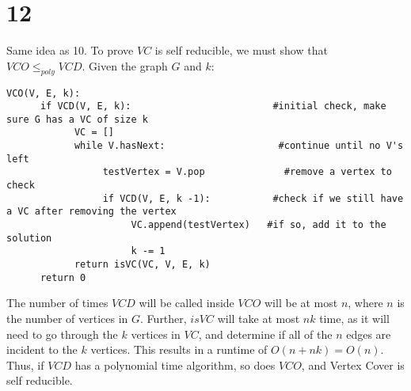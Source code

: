 \documentclass[letterpaper,notitlepage,twoside]{article}
\begin{document}
\section*{12}
Same idea as 10. To prove $VC$ is self reducible, we must show that $VCO \leq _{poly} VCD$. Given the graph $G$ and $k$:
\begin{verbatim}
VCO(V, E, k):
      if VCD(V, E, k):                         #initial check, make sure G has a VC of size k
            VC = []                              
            while V.hasNext:                    #continue until no V's left
                 testVertex = V.pop              #remove a vertex to check 
                 if VCD(V, E, k -1):           #check if we still have a VC after removing the vertex
                      VC.append(testVertex)   #if so, add it to the solution
                      k -= 1
            return isVC(VC, V, E, k)
      return 0
\end{verbatim}
The number of times $VCD$ will be called inside $VCO$ will be at most $n$, where $n$ is the number of vertices in $G$. Further, $isVC$ will take at most $nk$ time, as it will need to go through the $k$ vertices in $VC$, and determine if all of the $n$ edges are incident to the $k$ vertices. This results in a runtime of $O(n + nk) = O(n)$. Thus, if $VCD$ has a polynomial time algorithm, so does $VCO$, and Vertex Cover is self reducible. 
\end{document}
